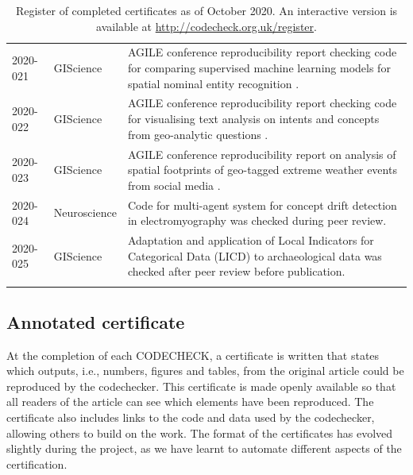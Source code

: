 \documentclass[12pt]{article}
\begin{document}
\begin{table}
\begin{tabular}{llp{12cm}}
    2020-021  \cite{cert-2020-021} & GIScience & AGILE conference reproducibility report checking code for comparing supervised machine learning models for spatial nominal entity recognition \cite{Medad2020}. \\ %
    2020-022  \cite{cert-2020-022} & GIScience & AGILE conference reproducibility report checking code for visualising text analysis on intents and concepts from geo-analytic questions \cite{Xu2020}. \\ %
    2020-023  \cite{cert-2020-023} & GIScience & AGILE conference reproducibility report on analysis of spatial footprints of geo-tagged extreme weather events from social media \cite{Owuor2020}. \\
    2020-024  \cite{cert-2020-024} & Neuroscience & Code for multi-agent system for concept drift detection in electromyography \cite{vieira_driftage_2020} was checked during peer review. \\ %
    2020-025  \cite{cert-2020-025} & GIScience & Adaptation and application of Local Indicators for Categorical Data (LICD) to archaeological data \cite{carrer_application_2021} was checked after peer review before publication. \\ %
    \\ \bottomrule
  \end{tabular}
  \caption{Register of completed certificates as of October 2020.  An interactive version
  is available at \url{http://codecheck.org.uk/register}. %
  }
  \label{tab:register}
\end{table}

\subsection*{Annotated certificate}\label{annotated-certificate}

At the completion of each CODECHECK, a certificate is written that
states which outputs, i.e., numbers, figures and tables, from the 
original article could be reproduced by the codechecker.
This certificate is made openly
available so that all readers of the article can see which elements
have been reproduced.  The certificate also includes links to the code
and data used by the codechecker, allowing others to build on the
work.
The format of the certificates has evolved slightly during the
project, as we have learnt to automate different aspects of the
certification.  
\end{document}

